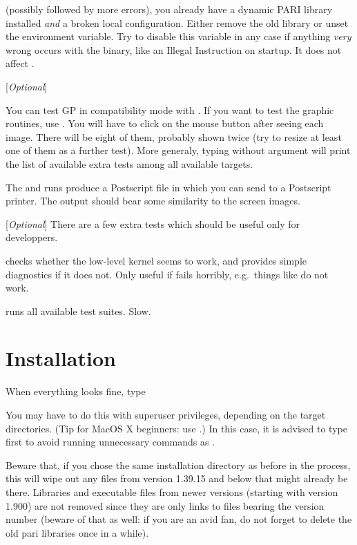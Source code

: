 
\noindent (possibly followed by more errors), you already have a dynamic PARI
library installed \emph{and} a broken local configuration. Either remove the
old library or unset the  environment variable. Try to
disable this variable in any case if anything \emph{very} wrong occurs with
the  binary, like an Illegal Instruction on startup. It does not
affect .

 [{\sl Optional\/}]

You can test GP in compatibility mode with . If you
want to test the graphic routines, use . You will
have to click on the mouse button after seeing each image. There will be
eight of them, probably shown twice (try to resize at least one of them
as a further test). More generaly, typing  without argument
will print the list of available extra tests among all available targets.

The  and  runs produce a Postscript
file  in  which you can send to a Postscript
printer. The output should bear some similarity to the screen images.

 [{\sl Optional\/}]
There are a few extra tests which should be useful only for developpers.

 checks whether the low-level kernel seems to work,
and provides simple diagnostics if it does not. Only useful if  fails horribly, e.g.~things like  do not work.

 runs all available test suites. Slow.

\section{Installation} When everything looks fine, type


\noindent You may have to do this with superuser privileges, depending on the
target directories. (Tip for MacOS X beginners: use .)
In this case, it is advised to type  first to avoid running
unnecessary commands as .

Beware that, if you chose the same installation directory as before in the
 process, this will wipe out any files from version 1.39.15
and below that might already be there. Libraries and executable files from
newer versions (starting with version 1.900) are not removed since they are
only links to files bearing the version number (beware of that as well: if
you are an avid  fan, do not forget to delete the old pari libraries
once in a while).

